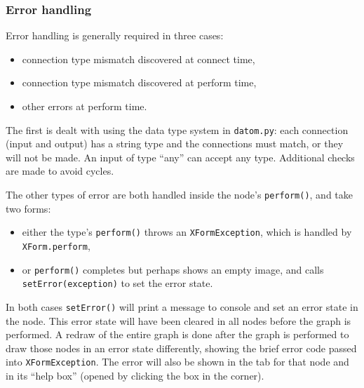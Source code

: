 \subsubsection{Error handling}
\label{errorhandling}
Error handling is generally required in three cases:
\begin{itemize}
\item connection type mismatch discovered at connect time,
\item connection type mismatch discovered at perform time,
\item other errors at perform time.
\end{itemize}
The first is dealt with using the data type system
in \texttt{datom.py}: each connection (input and output) has a string
type and the connections must match, or they will not be made. An input
of type ``any'' can accept any type. Additional checks are made to avoid
cycles.

The other types of error are both handled inside the node's \texttt{perform()},
and take two forms:
\begin{itemize}
\item either the type's \texttt{perform()} throws an \texttt{XFormException}, which
is handled by \texttt{XForm.perform},
\item or \texttt{perform()} completes but perhaps shows an empty image,
and calls \texttt{setError(exception)} to set the error state.
\end{itemize}
In both cases \texttt{setError()} will print a message to console and
set an error state in the node. This error state
will have been cleared in all nodes before the graph is performed. A redraw of the
entire graph is done after the graph is performed to
draw those nodes in an error state differently, showing the 
brief error code passed into \texttt{XFormException}. The error
will also be shown in the tab for that node and in its ``help box''
(opened by clicking the box in the corner).

